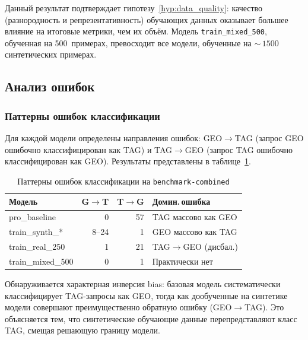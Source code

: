 Данный результат подтверждает гипотезу~\ref{hyp:data_quality}: качество (разнородность и репрезентативность) обучающих данных оказывает большее влияние на итоговые метрики, чем их объём. Модель \texttt{train\_mixed\_500}, обученная на 500~примерах, превосходит все модели, обученные на ${\sim}\,1500$ синтетических примерах.

\subsection{Анализ ошибок} \label{subsec:error_analysis}

\subsubsection{Паттерны ошибок классификации}

Для каждой модели определены направления ошибок: GEO$\to$TAG (запрос GEO ошибочно классифицирован как TAG) и TAG$\to$GEO (запрос TAG ошибочно классифицирован как GEO). Результаты представлены в таблице~\ref{tab:error_patterns}.

\begin{table}[H]
\centering
\caption{Паттерны ошибок классификации на \texttt{benchmark-combined}}
\label{tab:error_patterns}
\def\arraystretch{1.15}
\setlength\tabcolsep{0.4em}
\begin{tabular}{l r r l}
    \toprule
    \textbf{Модель} & \textbf{G$\to$T} & \textbf{T$\to$G} & \textbf{Домин.\,ошибка} \\
    \midrule
    pro\_baseline      &  0 & 57 & TAG массово как GEO \\
    train\_synth\_*    &  8--24 &  1 & GEO массово как TAG \\
    train\_real\_250   &  1 & 21 & TAG$\to$GEO (дисбал.) \\
    train\_mixed\_500  &  0 &  1 & Практически нет \\
    \bottomrule
\end{tabular}
\end{table}

Обнаруживается характерная инверсия bias: базовая модель систематически классифицирует TAG-запросы как GEO, тогда как дообученные на синтетике модели совершают преимущественно обратную ошибку (GEO$\to$TAG). Это объясняется тем, что синтетические обучающие данные перепредставляют класс TAG, смещая решающую границу модели.


